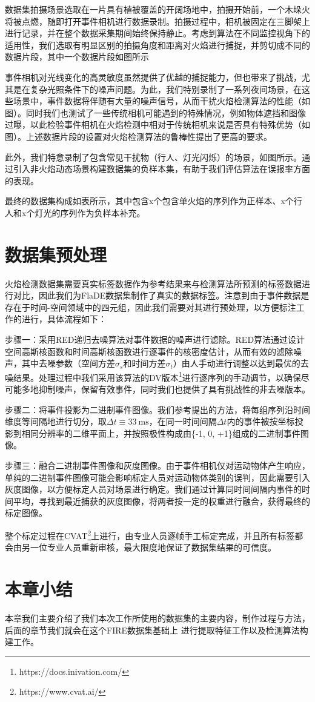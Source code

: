数据集拍摄场景选取在一片具有植被覆盖的开阔场地中，拍摄开始前，一个木垛火将被点燃，随即打开事件相机进行数据录制。拍摄过程中，相机被固定在三脚架上进行记录，并在整个数据采集期间始终保持静止。考虑到算法在不同监控视角下的适用性，我们选取有明显区别的拍摄角度和距离对火焰进行捕捉，并剪切成不同的数据片段，其中一个数据片段如图所示

事件相机对光线变化的高灵敏度虽然提供了优越的捕捉能力，但也带来了挑战，尤其是在复杂光照条件下的噪声问题。为此，我们特别录制了一系列夜间场景，在这些场景中，事件数据将伴随有大量的噪声信号，从而干扰火焰检测算法的性能（如图）。同时我们也测试了一些传统相机可能遇到的特殊情况，例如物体遮挡和图像过曝，以此检验事件相机在火焰检测中相对于传统相机来说是否具有特殊优势（如图）。上述数据片段的设置对火焰检测算法的鲁棒性提出了更高的要求。

此外，我们特意录制了包含常见干扰物（行人、灯光闪烁）的场景，如图所示。通过引入非火焰动态场景构建数据集的负样本集，有助于我们评估算法在误报率方面的表现。

最终的数据集构成如表所示，其中包含x个包含单火焰的序列作为正样本、x个行人和x个灯光的序列作为负样本补充。

\section{数据集预处理}
火焰检测数据集需要真实标签数据作为参考结果来与检测算法所预测的标签数据进行对比，因此我们为FlaDE数据集制作了真实的数据标签。注意到由于事件数据是存在于时间-空间领域中的四元组，因此我们需要对其进行预处理，以方便标注工作的进行，具体流程如下：

步骤一：采用RED递归去噪算法\cite{ding2023}对事件数据的噪声进行滤除。RED算法通过设计空间高斯核函数和时间高斯核函数进行逐事件的核密度估计，从而有效的滤除噪声，其中去噪参数（空间方差$\sigma_s$和时间方差$\sigma_t$）由人手动进行调整以达到最优的去噪结果。处理过程中我们采用该算法的DV版本\footnote{https://docs.inivation.com/}进行逐序列的手动调节，以确保尽可能多地抑制噪声，保留有效事件，同时我们也提供了具有挑战性的非去噪版本。

步骤二：将事件投影为二进制事件图像。我们参考\citet{kogler2009bio}提出的方法，将每组序列沿时间维度等间隔地进行切分，取$\Delta{t} \equiv \SI{33}{\milli\second}$，在同一时间间隔$\Delta{t}$内的事件被按坐标投影到相同分辨率的二维平面上，并按照极性构成由\{-1, 0, +1\}组成的二进制事件图像。

步骤三：融合二进制事件图像和灰度图像。由于事件相机仅对运动物体产生响应，单纯的二进制事件图像可能会影响标定人员对运动物体类别的误判，因此需要引入灰度图像，以方便标定人员对场景进行确定。我们通过计算同时间间隔内事件的时间平均，寻找到最近捕获的灰度图像，将两者按一定的权重进行融合，获得最终的标定图像。

整个标定过程在CVAT\footnote{https://www.cvat.ai/}上进行，由专业人员逐帧手工标定完成，并且所有标签都会由另一位专业人员重新审核，最大限度地保证了数据集结果的可信度。

\section{本章小结}
本章我们主要介绍了我们本次工作所使用的数据集的主要内容，制作过程与方法，后面的章节我们就会在这个FIRE数据集基础上
进行提取特征工作以及检测算法构建工作。